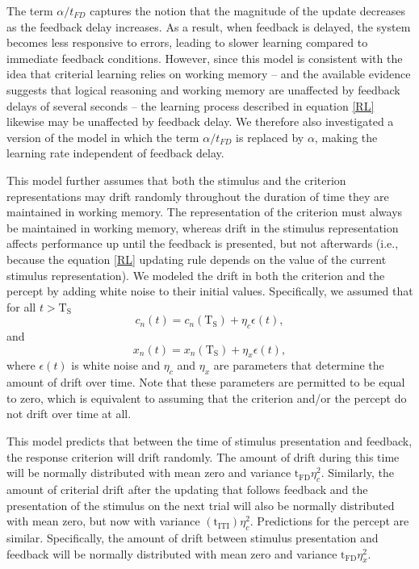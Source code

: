 \documentclass[doc, floatsintext]{apa7}
\begin{document}
The term $\alpha/t_{FD}$ captures the notion that the
magnitude of the update decreases as the feedback delay
increases.  As a result, when feedback is delayed, the
system becomes less responsive to errors, leading to slower
learning compared to immediate feedback conditions. However,
since this model is consistent with the idea that criterial
learning relies on working memory -- and the available
evidence suggests that logical reasoning and working memory
are unaffected by feedback delays of several seconds
\parencite[e.g., in one-dimensional rule-based category
learning tasks;][]{ell2009critrial, MaddoxAshbyBohil2003,
MaddoxIng2005} -- the learning process described in equation
\ref{RL} likewise may be unaffected by feedback delay. We
therefore also investigated a version of the model in which
the term $\alpha/t_{FD}$ is replaced by $\alpha$, making the
learning rate independent of feedback delay.

This model further assumes that both the stimulus and the
criterion representations may drift randomly throughout the
duration of time they are maintained in working memory. The
representation of the criterion must always be maintained in
working memory, whereas drift in the stimulus representation
affects performance up until the feedback is presented, but
not afterwards (i.e., because the equation \ref{RL} updating
rule depends on the value of the current stimulus
representation). We modeled the drift in both the criterion
and the percept by adding white noise to their initial
values. Specifically, we assumed that for all
$t>\text{T}_\text{S}$
\begin{equation}
  c_n(t) = c_n(\text{T}_\text{S}) + \eta_c \epsilon(t),
  \label{eq:criterion}
\end{equation}
and
\begin{equation}
  x_n(t) = x_n(\text{T}_\text{S}) + \eta_x \epsilon(t),
  \label{eq:percept}
\end{equation}
where $\epsilon(t)$ is white noise and $\eta_c$ and $\eta_x$
are parameters that determine the amount of drift over time.
Note that these parameters are permitted to be equal to
zero, which is equivalent to assuming that the criterion
and/or the percept do not drift over time at all.

This model predicts that between the time of stimulus
presentation and feedback, the response criterion will drift
randomly. The amount of drift during this time will be
normally distributed with mean zero and variance
$\text{t}_\text{FD} \eta_c^2$. Similarly, the amount of
criterial drift after the updating that follows feedback and
the presentation of the stimulus on the next trial will also
be normally distributed with mean zero, but now with
variance $(\text{t}_\text{ITI}) \eta_c^2$. Predictions for
the percept are similar. Specifically, the amount of drift
between stimulus presentation and feedback will be normally
distributed with mean zero and variance $\text{t}_\text{FD}
\eta_x^2$.
\end{document}
